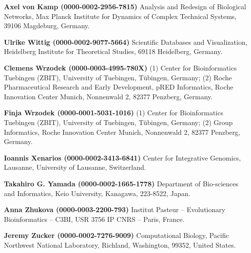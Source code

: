 \documentclass{sbml-paper}
\begin{document}
\textbf{Axel von Kamp (0000-0002-2956-7815)} Analysis and Redesign of Biological Networks, Max Planck Institute for Dynamics of Complex Technical Systems, 39106 Magdeburg, Germany.

\textbf{Ulrike Wittig (0000-0002-9077-5664)} Scientific Databases and Visualization, Heidelberg Institute for Theoretical Studies, 69118 Heidelberg, Germany.

\textbf{Clemens Wrzodek (0000-0003-4995-780X)} (1) Center for Bioinformatics Tuebingen (ZBIT), University of Tuebingen, Tübingen, Germany; (2) Roche Pharmaceutical Research and Early Development, pRED Informatics, Roche Innovation Center Munich, Nonnenwald 2, 82377 Penzberg, Germany.

\textbf{Finja Wrzodek (0000-0001-5031-1016)} (1) Center for Bioinformatics Tuebingen (ZBIT), University of Tuebingen, Tübingen, Germany; (2) Group Informatics, Roche Innovation Center Munich, Nonnenwald 2, 82377 Penzberg, Germany.

\textbf{Ioannis Xenarios (0000-0002-3413-6841)} Center for Integrative Genomics, Lausanne, University of Lausanne, Switzerland.

\textbf{Takahiro G. Yamada (0000-0002-1665-1778)} Department of Bio-sciences and Informatics, Keio University, Kanagawa, 223-8522, Japan.

\textbf{Anna Zhukova (0000-0003-2200-793)} Institut Pasteur – Evolutionary Bioinformatics – C3BI, USR 3756 IP CNRS – Paris, France.

\textbf{Jeremy Zucker (0000-0002-7276-9009)} Computational Biology, Pacific Northwest National Laboratory, Richland, Washington, 99352, United States.
\end{document}
